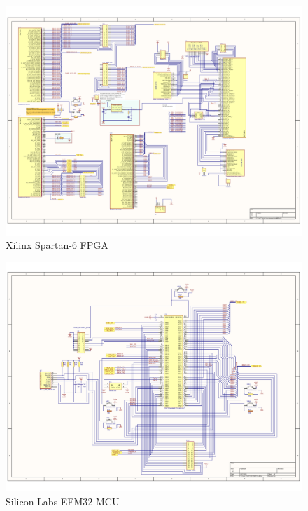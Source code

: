 \begin{figure}
    \includegraphics[width=\linewidth]{img/FPGA_Xilinx_Spartan6.pdf}
    \caption{Xilinx Spartan-6 FPGA}
    \label{fig:FPGA_Xilinx_Spartan6}
\end{figure}

\begin{figure}
    \includegraphics[width=\linewidth]{img/MCU_EFM32.pdf}
    \caption{Silicon Labs EFM32 MCU}
    \label{fig:MCU_EFM32}
\end{figure}

